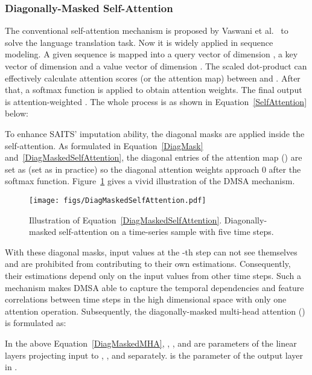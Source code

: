 \documentclass{article}
\begin{document}
\subsubsection{Diagonally-Masked Self-Attention} \label{SAITS: diagonally-masked SA}
The conventional self-attention mechanism is proposed by Vaswani et al.~\cite{Vaswani2017SelfAttention} to solve the language translation task. Now it is widely applied in sequence modeling. A given sequence is mapped into a query vector  of dimension , a key vector  of dimension  and a value vector  of dimension . The scaled dot-product can effectively calculate attention scores (or the attention map) between  and . After that, a softmax function is applied to obtain attention weights. The final output is attention-weighted . The whole process is as shown in Equation~\ref{SelfAttention} below:



To enhance SAITS' imputation ability, the diagonal masks are applied inside the self-attention. As formulated in Equation~\ref{DiagMask} and~\ref{DiagMaskedSelfAttention}, the diagonal entries of the attention map () are set as  (set as  in practice) so the diagonal attention weights approach 0 after the softmax function. Figure~\ref{fig:DiagMaskedSelfAttention} gives a vivid illustration of the DMSA mechanism.





\begin{figure}[!h]
	\centering
	\texttt{[image: figs/DiagMaskedSelfAttention.pdf]}
	\caption{Illustration of Equation~\ref{DiagMaskedSelfAttention}. Diagonally-masked self-attention on a time-series sample with five time steps. }
	\label{fig:DiagMaskedSelfAttention}
\end{figure}

With these diagonal masks, input values at the -th step can not see themselves and are prohibited from contributing to their own estimations. Consequently, their estimations depend only on the input values from other  time steps. Such a mechanism makes DMSA able to capture the temporal dependencies and feature correlations between time steps in the high dimensional space with only one attention operation. Subsequently, the diagonally-masked multi-head attention () is formulated as:



In the above Equation~\ref{DiagMaskedMHA}, , , and  are parameters of the linear layers projecting input  to , , and  separately.  is the parameter of the output layer in . 
\end{document}
